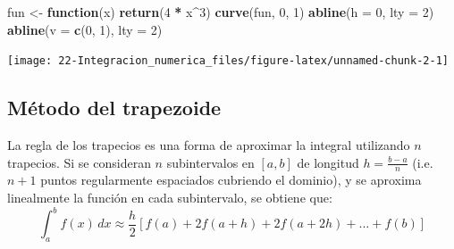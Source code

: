 \documentclass[]{book}
\newenvironment{Shaded}{\begin{snugshade}}{\end{snugshade}}
\newcommand{\KeywordTok}[1]{\textcolor[rgb]{0.13,0.29,0.53}{\textbf{#1}}}
\newcommand{\DataTypeTok}[1]{\textcolor[rgb]{0.13,0.29,0.53}{#1}}
\newcommand{\DecValTok}[1]{\textcolor[rgb]{0.00,0.00,0.81}{#1}}
\newcommand{\StringTok}[1]{\textcolor[rgb]{0.31,0.60,0.02}{#1}}
\newcommand{\ControlFlowTok}[1]{\textcolor[rgb]{0.13,0.29,0.53}{\textbf{#1}}}
\newcommand{\OperatorTok}[1]{\textcolor[rgb]{0.81,0.36,0.00}{\textbf{#1}}}
\newcommand{\NormalTok}[1]{#1}
\theoremstyle{definition}
\theoremstyle{definition}
\theoremstyle{definition}
\theoremstyle{remark}
\begin{document}
\begin{Shaded}
\begin{Highlighting}[]
\NormalTok{fun <-}\StringTok{ }\ControlFlowTok{function}\NormalTok{(x) }\KeywordTok{return}\NormalTok{(}\DecValTok{4} \OperatorTok{*}\StringTok{ }\NormalTok{x}\OperatorTok{^}\DecValTok{3}\NormalTok{)}
\KeywordTok{curve}\NormalTok{(fun, }\DecValTok{0}\NormalTok{, }\DecValTok{1}\NormalTok{)}
\KeywordTok{abline}\NormalTok{(}\DataTypeTok{h =} \DecValTok{0}\NormalTok{, }\DataTypeTok{lty =} \DecValTok{2}\NormalTok{)}
\KeywordTok{abline}\NormalTok{(}\DataTypeTok{v =} \KeywordTok{c}\NormalTok{(}\DecValTok{0}\NormalTok{, }\DecValTok{1}\NormalTok{), }\DataTypeTok{lty =} \DecValTok{2}\NormalTok{)}
\end{Highlighting}
\end{Shaded}

\begin{center}\texttt{[image: 22-Integracion\_numerica\_files/figure-latex/unnamed-chunk-2-1]} \end{center}

\subsection{Método del trapezoide}\label{metodo-del-trapezoide}

La regla de los trapecios es una forma de aproximar la integral
utilizando \(n\) trapecios. Si se consideran \(n\) subintervalos en
\([a,b]\) de longitud \(h= \frac{b-a}{n}\) (i.e. \(n + 1\) puntos
regularmente espaciados cubriendo el dominio), y se aproxima linealmente
la función en cada subintervalo, se obtiene que:
\[\int_a^b f(x)\, dx \approx \frac{h}{2} [f(a)+2f(a+h)+2f(a+2h)+...+f(b)]\]
\end{document}
